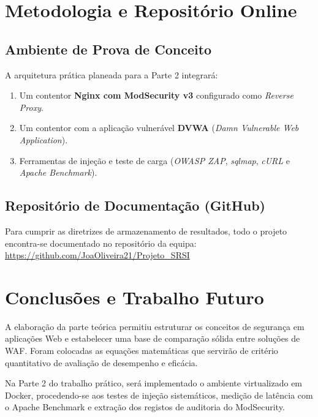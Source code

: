 \documentclass[11pt,a4paper]{article}
\begin{document}
\clearpage
\section{Metodologia e Repositório Online}
\label{sec:metodologia}

\subsection{Ambiente de Prova de Conceito}
A arquitetura prática planeada para a Parte 2 integrará:
\begin{enumerate}
    \item Um contentor \textbf{Nginx com ModSecurity v3} configurado como \textit{Reverse Proxy}.
    \item Um contentor com a aplicação vulnerável \textbf{DVWA} (\textit{Damn Vulnerable Web Application}).
    \item Ferramentas de injeção e teste de carga (\textit{OWASP ZAP}, \textit{sqlmap}, \textit{cURL} e \textit{Apache Benchmark}).
\end{enumerate}

\subsection{Repositório de Documentação (GitHub)}
Para cumprir as diretrizes de armazenamento de resultados, todo o projeto encontra-se documentado no repositório da equipa: \url{https://github.com/JoaOliveira21/Projeto_SRSI}

\clearpage
\section{Conclusões e Trabalho Futuro}
\label{sec:conclusao}
A elaboração da parte teórica permitiu estruturar os conceitos de segurança em aplicações Web e estabelecer uma base de comparação sólida entre soluções de WAF. Foram colocadas as equações matemáticas que servirão de critério quantitativo de avaliação de desempenho e eficácia.

Na Parte 2 do trabalho prático, será implementado o ambiente virtualizado em Docker, procedendo-se aos testes de injeção sistemáticos, medição de latência com o Apache Benchmark e extração dos registos de auditoria do ModSecurity.
\end{document}
